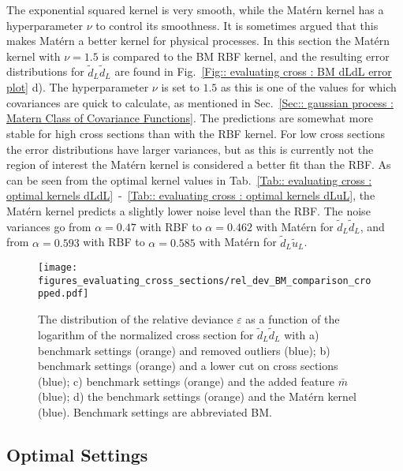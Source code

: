 \documentclass[twoside,english]{uiofysmaster}
\begin{document}
The exponential squared kernel is very smooth, while the Mat\'{e}rn kernel has a hyperparameter $\nu$ to control its smoothness. It is sometimes argued that this makes Mat\'{e}rn a better kernel for physical processes. In this section the Mat\'{e}rn kernel with $\nu=1.5$ is compared to the BM RBF kernel, and the resulting error distributions for $\tilde{d}_L \tilde{d}_L$ are found in Fig.~\ref{Fig:: evaluating cross : BM dLdL error plot} d). The hyperparameter $\nu$ is set to $1.5$ as this is one of the values for which covariances are quick to calculate, as mentioned in Sec.~\ref{Sec:: gaussian process : Matern Class of Covariance Functions}. The predictions are somewhat more stable for high cross sections than with the RBF kernel. For low cross sections the error distributions have larger variances, but as this is currently not the region of interest the Mat\'{e}rn kernel is considered a better fit than the RBF. As can be seen from the optimal kernel values in Tab.~\ref{Tab:: evaluating cross : optimal kernels dLdL}~-~\ref{Tab:: evaluating cross : optimal kernels dLuL}, the Mat\'{e}rn kernel predicts a slightly lower noise level than the RBF. The noise variances go from $\alpha = 0.47$ with RBF to $\alpha = 0.462$ with Mat\'{e}rn for $\tilde{d}_L \tilde{d}_L$, and from $\alpha = 0.593$ with RBF to $\alpha = 0.585$ with Mat\'{e}rn for $\tilde{d}_L \tilde{u}_L$. 

\begin{figure}
\centering
\texttt{[image: figures\_evaluating\_cross\_sections/rel\_dev\_BM\_comparison\_cropped.pdf]}
\caption{The distribution of the relative deviance $\varepsilon$ as a function of the logarithm of the normalized cross section for $\tilde{d}_L \tilde{d}_L$ with a) benchmark settings (orange) and removed outliers (blue); b) benchmark settings (orange) and a lower cut on cross sections (blue); c) benchmark settings (orange) and the added feature $\bar{m}$ (blue); d) the benchmark settings (orange) and the Mat\'{e}rn kernel (blue). Benchmark settings are abbreviated BM.}
\label{Fig:: evaluating cross : errors BM dLdL}
\end{figure}


\subsection{Optimal Settings}\label{Sec:: evaluating cross : Optimal Settings}
\end{document}
